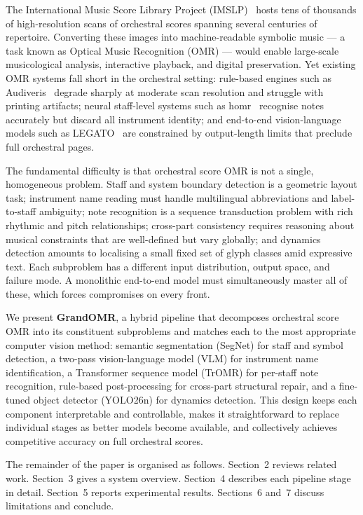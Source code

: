 \documentclass[11pt,a4paper]{article}
\begin{document}
The International Music Score Library Project (IMSLP)~\cite{imslp} hosts tens of thousands of high-resolution scans of orchestral scores spanning several centuries of repertoire.
Converting these images into machine-readable symbolic music — a task known as Optical Music Recognition (OMR) — would enable large-scale musicological analysis, interactive playback, and digital preservation.
Yet existing OMR systems fall short in the orchestral setting: rule-based engines such as Audiveris~\cite{audiveris} degrade sharply at moderate scan resolution and struggle with printing artifacts; neural staff-level systems such as homr~\cite{oemer} recognise notes accurately but discard all instrument identity; and end-to-end vision-language models such as LEGATO~\cite{legato} are constrained by output-length limits that preclude full orchestral pages.

The fundamental difficulty is that orchestral score OMR is not a single, homogeneous problem.
Staff and system boundary detection is a geometric layout task; instrument name reading must handle multilingual abbreviations and label-to-staff ambiguity; note recognition is a sequence transduction problem with rich rhythmic and pitch relationships; cross-part consistency requires reasoning about musical constraints that are well-defined but vary globally; and dynamics detection amounts to localising a small fixed set of glyph classes amid expressive text.
Each subproblem has a different input distribution, output space, and failure mode.
A monolithic end-to-end model must simultaneously master all of these, which forces compromises on every front.

We present \textbf{GrandOMR}, a hybrid pipeline that decomposes orchestral score OMR into its constituent subproblems and matches each to the most appropriate computer vision method: semantic segmentation (SegNet) for staff and symbol detection, a two-pass vision-language model (VLM) for instrument name identification, a Transformer sequence model (TrOMR) for per-staff note recognition, rule-based post-processing for cross-part structural repair, and a fine-tuned object detector (YOLO26n) for dynamics detection.
This design keeps each component interpretable and controllable, makes it straightforward to replace individual stages as better models become available, and collectively achieves competitive accuracy on full orchestral scores.

The remainder of the paper is organised as follows.
Section~2 reviews related work.
Section~3 gives a system overview.
Section~4 describes each pipeline stage in detail.
Section~5 reports experimental results.
Sections~6 and~7 discuss limitations and conclude.
\end{document}
